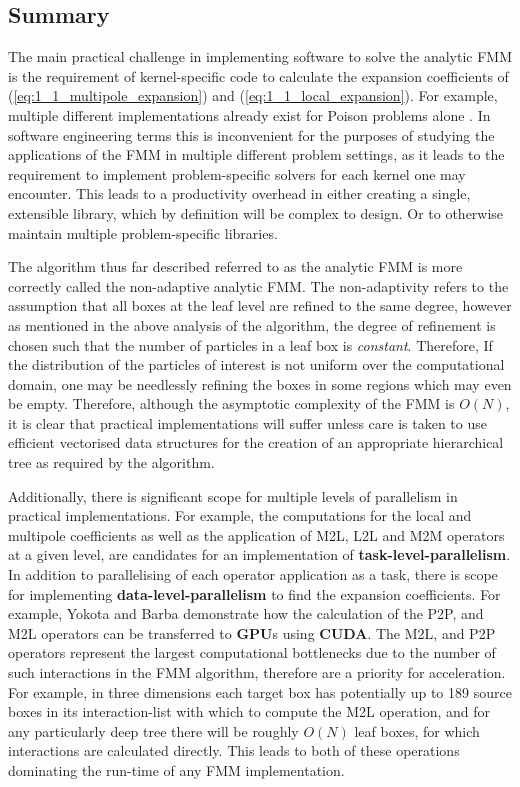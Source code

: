 \subsection{Summary}

The main practical challenge in implementing software to solve the analytic FMM
is the requirement of kernel-specific code to calculate the expansion coefficients of
(\ref{eq:1_1_multipole_expansion}) and (\ref{eq:1_1_local_expansion}). For example,
multiple different implementations already exist for Poison problems alone \cite{Greengard:1996:JCP, Etheridge:2001:SIAM}.
In software engineering terms this is inconvenient for the purposes of studying
the applications of the FMM in multiple different problem settings, as it leads to the requirement
to implement problem-specific solvers for each kernel one may encounter. This
leads to a productivity overhead in either creating a single, extensible
library, which by definition will be complex to design. Or to otherwise
maintain multiple problem-specific libraries.

The algorithm thus far described referred to as the analytic FMM is more correctly
called the non-adaptive analytic FMM. The non-adaptivity refers to the assumption that
all boxes at the leaf level are refined to the same degree, however as mentioned
in the above analysis of the algorithm, the degree of refinement is chosen such
that the number of particles in a leaf box is \textit{constant}. Therefore, If
the distribution of the particles of interest is not uniform over the computational
domain, one may be needlessly refining the boxes in some regions which may even be
empty. Therefore, although the asymptotic complexity of
the FMM is $O(N)$, it is clear that practical implementations will suffer unless
care is taken to use efficient vectorised data structures for the creation of an
appropriate hierarchical tree as required by the algorithm.

Additionally, there is significant scope for multiple levels of
parallelism in practical implementations. For example, the computations
for the local and multipole coefficients as well as the application of M2L, L2L
and M2M operators at a given level, are candidates for an implementation of
\textbf{\gls{task-level-parallelism}}. In addition to parallelising of each operator
application as a task, there is scope for implementing
\textbf{\gls{data-level-parallelism}} to find the expansion coefficients. For example,
Yokota and Barba \cite{Hwu:2011:MKP} demonstrate how the calculation of the P2P,
and M2L operators can be transferred to \textbf{\gls{GPU}}s using \textbf{\gls{CUDA}}.
The M2L, and P2P operators represent the largest computational bottlenecks due to
the number of such interactions in the FMM algorithm, therefore are a priority for
acceleration. For example, in three dimensions each target box has potentially
up to 189 source boxes in its \gls{interaction-list} with which to compute the
M2L operation, and for any particularly deep tree there will be roughly $O(N)$
leaf boxes, for which interactions are calculated directly. This leads to both of
these operations dominating the run-time of any \gls{FMM} implementation.

